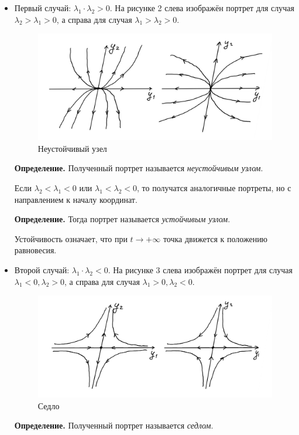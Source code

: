 \begin{itemize}
\item Первый случай: $\lambda_1 \cdot \lambda_2 > 0$.
На рисунке 2 слева изображён портрет для случая $\lambda_2 > \lambda_1 > 0$, а справа для случая $\lambda_1 > \lambda_2 > 0$.

\begin{figure}[h]
    \includegraphics[scale=0.25]{unstable-knot}
    \centering
    \caption{Неустойчивый узел}
\end{figure}

\textbf{Определение.} Полученный портрет называется \textit{неустойчивым узлом}.

Если $\lambda_2 < \lambda_1 < 0$ или $\lambda_1 < \lambda_2 < 0$, то получатся аналогичные портреты, но с направлением к началу координат.

\textbf{Определение.} Тогда портрет называется \textit{устойчивым узлом}.

Устойчивость означает, что при $t \to +\infty$ точка движется к положению равновесия.

\item Второй случай: $\lambda_1 \cdot \lambda_2 < 0$. На рисунке 3 слева изображён портрет для случая $\lambda_1 < 0, \lambda_2 > 0$, а справа для случая $\lambda_1 > 0, \lambda_2 < 0$.

\begin{figure}[h]
    \includegraphics[scale=0.25]{seat}
    \centering
    \caption{Седло}
\end{figure}

\textbf{Определение.} Полученный портрет называется \textit{седлом}.
\end{itemize}

